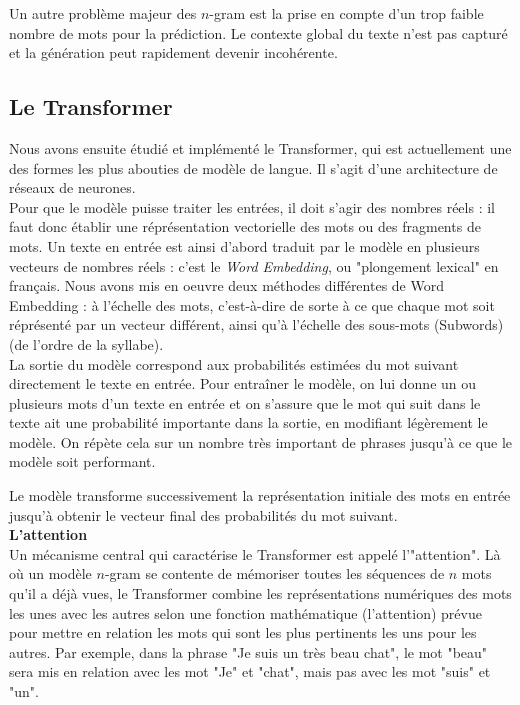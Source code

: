 Un autre problème majeur des $n$-gram est la prise en compte d'un trop faible nombre de mots pour la prédiction. Le contexte global du texte n'est pas capturé et la génération peut rapidement devenir incohérente.

\subsection{Le Transformer}

Nous avons ensuite étudié et implémenté le Transformer, qui est actuellement une des formes les plus abouties de modèle de langue. Il s'agit d'une architecture de réseaux de neurones. \\

Pour que le modèle puisse traiter les entrées, il doit s'agir des nombres réels : il faut donc établir une réprésentation vectorielle des mots ou des fragments de mots. Un texte en entrée est ainsi d'abord traduit par le modèle en plusieurs vecteurs de nombres réels : c'est le \textit{Word Embedding}, ou "plongement lexical" en français. Nous avons mis en oeuvre deux méthodes différentes de Word Embedding : à l'échelle des mots, c'est-à-dire de sorte à ce que chaque mot soit réprésenté par un vecteur différent, ainsi qu'à l'échelle des sous-mots (Subwords) (de l'ordre de la syllabe). \\

La sortie du modèle correspond aux probabilités estimées du mot suivant directement le texte en entrée. Pour entraîner le modèle, on lui donne un ou plusieurs mots d'un texte en entrée et on s'assure que le mot qui suit dans le texte ait une probabilité importante dans la sortie, en modifiant légèrement le modèle. On répète cela sur un nombre très important de phrases jusqu'à ce que le modèle soit performant.

Le modèle transforme successivement la représentation initiale des mots en entrée jusqu'à obtenir le vecteur final des probabilités du mot suivant. \\

\textbf{L'attention} \\

Un mécanisme central qui caractérise le Transformer est appelé l'"attention". Là où un modèle $n$-gram se contente de mémoriser toutes les séquences de $n$ mots qu'il a déjà vues, le Transformer combine les représentations numériques des mots les unes avec les autres selon une fonction mathématique (l'attention) prévue pour mettre en relation les mots qui sont les plus pertinents les uns pour les autres. Par exemple, dans la phrase "Je suis un très beau chat", le mot "beau" sera mis en relation avec les mot "Je" et "chat", mais pas avec les mot "suis" et "un".

